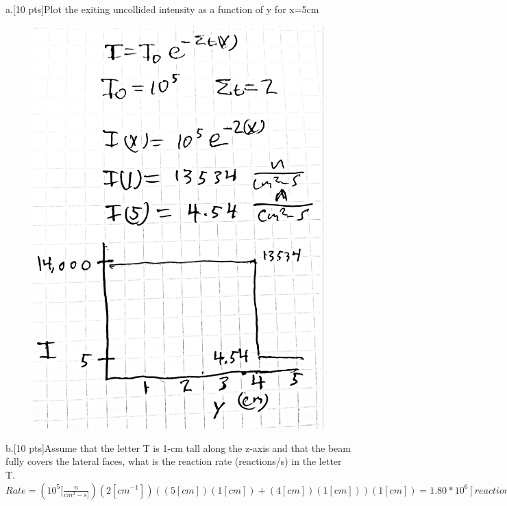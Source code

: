 \documentclass[12pt,fleqn, parskip=full]{scrartcl}
\begin{document}
a.[10 pts]Plot the exiting uncollided intensity as a function of y for x=5cm\\
\begin{figure}[H]
	\centering
	\includegraphics[scale=.1]{Image_3_hw_2}
\end{figure}
b.[10 pts]Assume that the letter T is 1-cm tall along the z-axis and that the beam fully covers the lateral faces, what is the reaction rate (reactions/s) in the letter T.\\
$Rate = (10^5 [\frac{n}{cm^2-s]})(2 [cm^{-1}])((5[cm])(1[cm])+(4[cm])(1[cm]))(1[cm])=1.80*10^6[reactions/s]$\\
\end{document}
